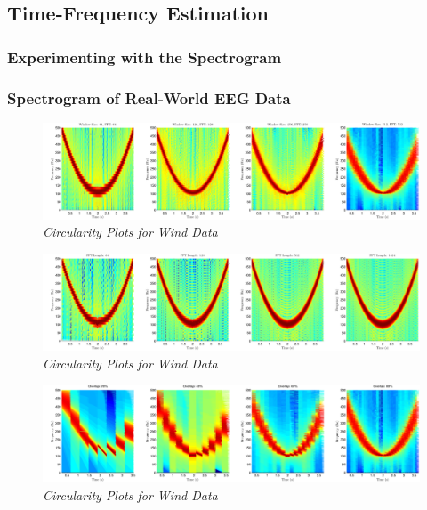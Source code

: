 \documentclass[./main.tex]{subfiles}
\begin{document}
\subsection{Time-Frequency Estimation}

\subsubsection{Experimenting with the Spectrogram}

\subsubsection{Spectrogram of Real-World EEG Data}

\begin{figure}[h]
	\centering 
	\includegraphics[scale=0.45]{fig/2/2_3_a_window_size.pdf}
	\caption{\textit{Circularity Plots for Wind Data}}
	\label{fig:}
\end{figure}

\begin{figure}[h]
	\centering 
	\includegraphics[scale=0.45]{fig/2/2_3_a_fft_len.pdf}
	\caption{\textit{Circularity Plots for Wind Data}}
	\label{fig:}
\end{figure}

\begin{figure}[h]
	\centering 
	\includegraphics[scale=0.45]{fig/2/2_3_a_overlap.pdf}
	\caption{\textit{Circularity Plots for Wind Data}}
	\label{fig:}
\end{figure}
\end{document}
